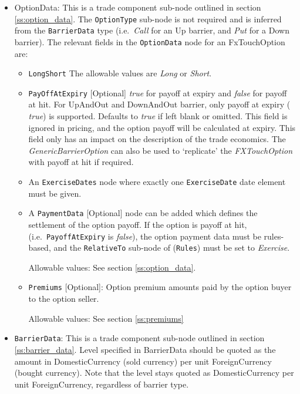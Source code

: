 \begin{itemize}

\item OptionData: This is a trade component sub-node outlined in section \ref{ss:option_data}. The \lstinline!OptionType! sub-node
is not required and is inferred from the \lstinline!BarrierData! type (i.e.\ \emph{Call} for an Up barrier, and \emph{Put} for a Down barrier).
The relevant fields in the \lstinline!OptionData! node for an FxTouchOption are:

\begin{itemize}
\item \lstinline!LongShort! The allowable values are \emph{Long} or \emph{Short}.

\item  \lstinline!PayOffAtExpiry! [Optional] \emph{true} for payoff at expiry and \emph{false} for payoff at hit.
For UpAndOut and DownAndOut barrier, only payoff at expiry ( \emph{true}) is supported. Defaults to  \emph{true} if left blank or omitted. This field is ignored in pricing, and the option payoff will be calculated at expiry. This field only has an impact on the description of the trade economics. The \emph{GenericBarrierOption} can also be used to `replicate' the \emph{FXTouchOption} with payoff at hit if required.

\item An \lstinline!ExerciseDates! node where exactly one \lstinline!ExerciseDate! date element must be given.

\item A \lstinline!PaymentData! [Optional] node can be added which defines the settlement of the option payoff. If the option is payoff at hit,
(i.e.\ \lstinline!PayoffAtExpiry! is \emph{false}), the option payment data must be rules-based, and the \lstinline!RelativeTo! sub-node of (\lstinline!Rules!) must be
set to \emph{Exercise}.

Allowable values: See section \ref{ss:option_data}.

\item \lstinline!Premiums! [Optional]: Option premium amounts paid by the option buyer to the option seller.

Allowable values:  See section \ref{ss:premiums}

\end{itemize}

\item \lstinline!BarrierData!: This is a trade component sub-node outlined in section \ref{ss:barrier_data}.
Level specified in BarrierData should be quoted as the amount in DomesticCurrency (sold currency) per unit ForeignCurrency (bought currency). Note that the level stays quoted as DomesticCurrency per unit ForeignCurrency, regardless of barrier type.


\end{itemize}
